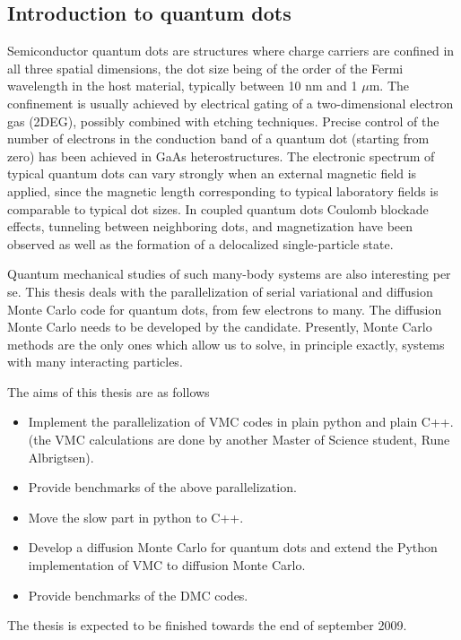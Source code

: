 \subsection*{Introduction to quantum dots}

Semiconductor quantum dots are structures where
charge carriers are confined in all three spatial dimensions, 
the dot size being of the order of the Fermi wavelength 
in the host material, typically between  10 nm and  1 $\mu$m.
The confinement is usually achieved by electrical gating of a 
two-dimensional electron gas (2DEG), 
possibly combined with etching techniques. Precise control of the
number of electrons in the conduction band of a quantum dot 
(starting from zero) has been achieved in GaAs heterostructures. 
The electronic spectrum of typical quantum dots
can vary strongly when an external magnetic field is applied, 
since the magnetic length corresponding to typical 
laboratory fields  is comparable to typical dot sizes.
In coupled quantum dots Coulomb blockade effects, 
tunneling between neighboring dots, and magnetization 
have been observed as well as the formation of a
delocalized single-particle state. 


Quantum mechanical studies of such many-body systems are also
interesting per se. 
This thesis deals with the parallelization of serial variational and diffusion 
Monte Carlo code for quantum dots, from few electrons to many.  The diffusion 
Monte Carlo needs to be developed by the candidate.
Presently, Monte Carlo methods are
the only ones which allow us to solve, in principle exactly, 
systems with many interacting particles. 




The aims of this thesis are as follows

\begin{itemize}
\item Implement the parallelization of VMC codes in plain python and plain C++.
(the VMC calculations are done by another Master of Science student, Rune Albrigtsen).
\item Provide benchmarks of the above parallelization.
\item Move the slow part in python to C++.
\item Develop a diffusion Monte Carlo for quantum dots and 
extend the Python implementation of VMC to diffusion Monte Carlo. 
\item Provide benchmarks of the DMC codes.


\end{itemize}



The thesis is expected to be finished towards the end  of september 2009.



